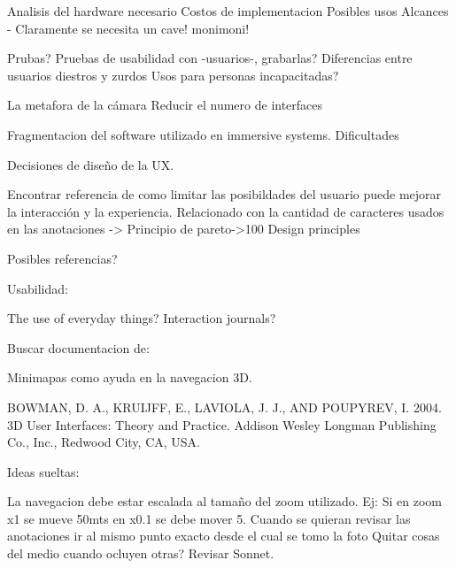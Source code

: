 Analisis del hardware necesario
Costos de implementacion
Posibles usos
Alcances - Claramente se necesita un cave! monimoni!

Prubas?
Pruebas de usabilidad con -usuarios-, grabarlas? 
Diferencias entre usuarios diestros y zurdos
Usos para personas incapacitadas?

La metafora de la cámara
Reducir el numero de interfaces

Fragmentacion del software utilizado en immersive systems.
Dificultades

Decisiones de diseño de la UX.

Encontrar referencia de como limitar las posibildades del usuario puede mejorar la interacción y la experiencia. Relacionado con la cantidad de caracteres usados en las anotaciones -> Principio de pareto->100 Design principles

Posibles referencias?

Usabilidad:

	The use of everyday things?
	Interaction journals?






Buscar documentacion de:

Minimapas como ayuda en la navegacion 3D.

BOWMAN, D. A., KRUIJFF, E., LAVIOLA, J. J., AND POUPYREV, I. 2004. 3D User Interfaces: Theory and Practice. Addison Wesley Longman Publishing Co., Inc., Redwood City, CA, USA.

Ideas sueltas:

	La navegacion debe estar escalada al tamaño del zoom utilizado. Ej: Si en zoom x1 se mueve 50mts en x0.1 se debe mover 5.
	Cuando se quieran revisar las anotaciones ir al mismo punto exacto desde el cual se tomo la foto
	Quitar cosas del medio cuando ocluyen otras? Revisar Sonnet.